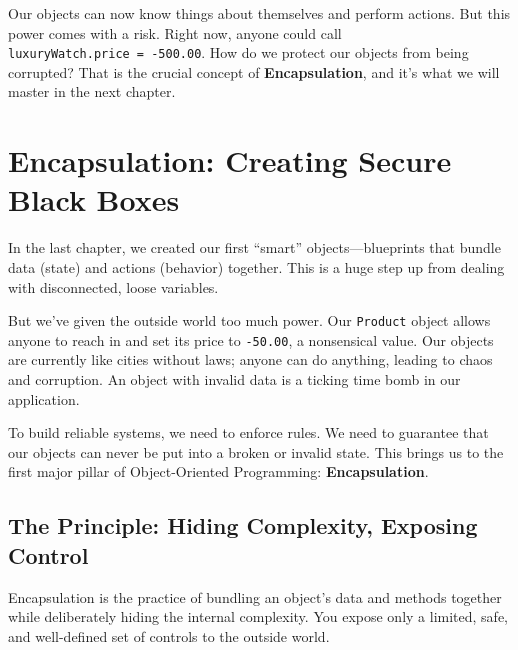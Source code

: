 \documentclass[
  letterpaper,
  DIV=11,
  numbers=noendperiod]{scrreprt}
\begin{document}
Our objects can now know things about themselves and perform actions.
But this power comes with a risk. Right now, anyone could call
\texttt{luxuryWatch.price\ =\ -500.00}. How do we protect our objects
from being corrupted? That is the crucial concept of
\textbf{Encapsulation}, and it's what we will master in the next
chapter.


\chapter{Encapsulation: Creating Secure Black
Boxes}\label{encapsulation-creating-secure-black-boxes}

In the last chapter, we created our first ``smart'' objects---blueprints
that bundle data (state) and actions (behavior) together. This is a huge
step up from dealing with disconnected, loose variables.

But we've given the outside world too much power. Our \texttt{Product}
object allows anyone to reach in and set its price to \texttt{-50.00}, a
nonsensical value. Our objects are currently like cities without laws;
anyone can do anything, leading to chaos and corruption. An object with
invalid data is a ticking time bomb in our application.

To build reliable systems, we need to enforce rules. We need to
guarantee that our objects can never be put into a broken or invalid
state. This brings us to the first major pillar of Object-Oriented
Programming: \textbf{Encapsulation}.

\section{The Principle: Hiding Complexity, Exposing
Control}\label{the-principle-hiding-complexity-exposing-control}

Encapsulation is the practice of bundling an object's data and methods
together while deliberately hiding the internal complexity. You expose
only a limited, safe, and well-defined set of controls to the outside
world.
\end{document}
